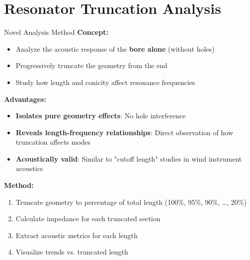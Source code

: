 \documentclass[aspectratio=169,10pt]{beamer}
\begin{document}
\section{Resonator Truncation Analysis}

\begin{frame}{Novel Analysis Method}
\textbf{Concept:}
\begin{itemize}
    \item Analyze the acoustic response of the \textbf{bore alone} (without holes)
    \item Progressively truncate the geometry from the end
    \item Study how length and conicity affect resonance frequencies
\end{itemize}

\textbf{Advantages:}
\begin{itemize}
    \item \textbf{Isolates pure geometry effects}: No hole interference
    \item \textbf{Reveals length-frequency relationships}: Direct observation of how truncation affects modes
    \item \textbf{Acoustically valid}: Similar to "cutoff length" studies in wind instrument acoustics
\end{itemize}

\textbf{Method:}
\begin{enumerate}
    \item Truncate geometry to percentage of total length (100\%, 95\%, 90\%, \ldots, 20\%)
    \item Calculate impedance for each truncated section
    \item Extract acoustic metrics for each length
    \item Visualize trends vs. truncated length
\end{enumerate}
\end{frame}
\end{document}
